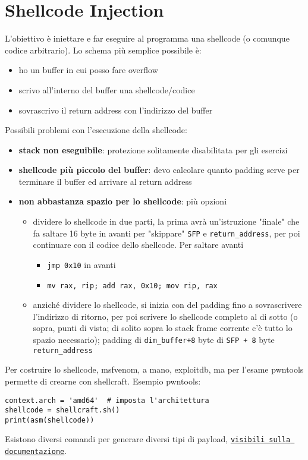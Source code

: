 \section{Shellcode Injection}

L'obiettivo è iniettare e far eseguire al programma una shellcode (o comunque codice arbitrario). Lo schema più semplice possibile è:
\begin{itemize}
	\item ho un buffer in cui posso fare overflow
	
    \item scrivo all'interno del buffer una shellcode/codice
	
    \item sovrascrivo il return address con l'indirizzo del buffer
\end{itemize}

Possibili problemi con l'esecuzione della shellcode: 
\begin{itemize}
	\item \textbf{stack non eseguibile}: protezione solitamente disabilitata per gli esercizi
	
    \item \textbf{shellcode più piccolo del buffer}: devo calcolare quanto padding serve per terminare il buffer ed arrivare al return address
	
    \item \textbf{non abbastanza spazio per lo shellcode}: più opzioni
	\begin{itemize}
		\item dividere lo shellcode in due parti, la prima avrà un'istruzione "finale" che fa saltare 16 byte in avanti per "skippare" \texttt{SFP} e \texttt{return\_address}, per poi continuare con il codice dello shellcode. Per saltare avanti
		\begin{itemize}
			\item \texttt{jmp 0x10} in avanti
		
        	\item \texttt{mv rax, rip; add rax, 0x10; mov rip, rax}
		\end{itemize}
        
		\item anziché dividere lo shellcode, si inizia con del padding fino a sovrascrivere l'indirizzo di ritorno, per poi scrivere lo shellcode completo al di sotto (o sopra, punti di vista; di solito sopra lo stack frame corrente c'è tutto lo spazio necessario); padding di \texttt{dim\_buffer+8} byte di \texttt{SFP + 8} byte \texttt{return\_address}
	\end{itemize}
\end{itemize}

Per costruire lo shellcode, msfvenom, a mano, exploitdb, ma per l'esame pwntools permette di crearne con shellcraft. Esempio pwntools: 
\begin{verbatim}
context.arch = 'amd64'  # imposta l'architettura
shellcode = shellcraft.sh()
print(asm(shellcode))
\end{verbatim}

Esistono diversi comandi per generare diversi tipi di payload, \href{https://docs.pwntools.com/en/stable/shellcraft.html}{\texttt{visibili sulla documentazione}}.